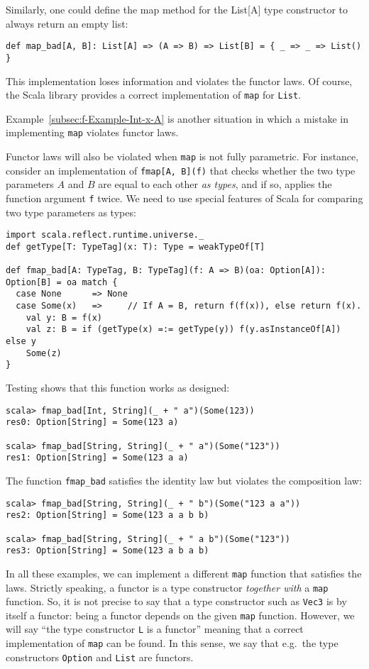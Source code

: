 Similarly, one could define the map method for the List{[}A{]} type
constructor to always return an empty list:
\begin{lstlisting}
def map_bad[A, B]: List[A] => (A => B) => List[B] = { _ => _ => List() }
\end{lstlisting}
This implementation loses information and violates the functor laws.
Of course, the Scala library provides a correct implementation of
\lstinline!map! for \lstinline!List!.

Example~\ref{subsec:f-Example-Int-x-A} is another situation in which
a mistake in implementing \lstinline!map! violates functor laws.

Functor laws will also be violated when \lstinline!map! is not fully
parametric. For instance, consider an implementation of \lstinline!fmap[A, B](f)!
that checks whether the two type parameters $A$ and $B$ are equal
to each other \emph{as types}, and if so, applies the function argument
\lstinline!f! twice. We need to use special features of Scala for
comparing two type parameters as types:
\begin{lstlisting}
import scala.reflect.runtime.universe._
def getType[T: TypeTag](x: T): Type = weakTypeOf[T]

def fmap_bad[A: TypeTag, B: TypeTag](f: A => B)(oa: Option[A]): Option[B] = oa match {
  case None      => None
  case Some(x)   =>     // If A = B, return f(f(x)), else return f(x).
    val y: B = f(x)
    val z: B = if (getType(x) =:= getType(y)) f(y.asInstanceOf[A]) else y
    Some(z)
}
\end{lstlisting}
Testing shows that this function works as designed:
\begin{lstlisting}
scala> fmap_bad[Int, String](_ + " a")(Some(123))
res0: Option[String] = Some(123 a)

scala> fmap_bad[String, String](_ + " a")(Some("123"))
res1: Option[String] = Some(123 a a)
\end{lstlisting}
The function \lstinline!fmap_bad! satisfies the identity law but
violates the composition law:
\begin{lstlisting}
scala> fmap_bad[String, String](_ + " b")(Some("123 a a"))
res2: Option[String] = Some(123 a a b b)

scala> fmap_bad[String, String](_ + " a b")(Some("123"))
res3: Option[String] = Some(123 a b a b)
\end{lstlisting}

In all these examples, we can implement a different \lstinline!map!
function that satisfies the laws. Strictly speaking, a functor is
a type constructor \emph{together with} a \lstinline!map! function.
So, it is not precise to say that a type constructor such as \lstinline!Vec3!
is by itself a functor: being a functor depends on the given \lstinline!map!
function. However, we will say ``the type constructor \lstinline!L!
is a functor'' meaning that a correct implementation of \lstinline!map!
can be found. In this sense, we say that e.g.~the type constructors
\lstinline!Option! and \lstinline!List! are functors.

